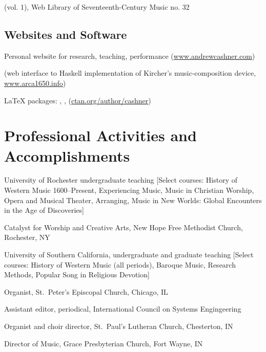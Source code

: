 \documentclass[11pt]{article}
\begin{document}
{
(vol. 1), Web Library of Seventeenth-Century Music no. 32}

\subsection{Websites and Software}

{Personal website for research, teaching, performance (\url{www.andrewcashner.com})}

{ (web interface to Haskell implementation of Kircher's
music-composition device, \url{www.arca1650.info})}

{\LaTeX{} packages: , ,
 (\url{ctan.org/author/cashner})}

\section{Professional Activities and Accomplishments}
{University of Rochester undergraduate teaching}
[Select courses: 
History of Western Music 1600--Present, 
Experiencing Music, 
Music in Christian Worship, 
Opera and Musical Theater, 
Arranging, 
Music in New Worlds: Global Encounters in the Age of Discoveries]

{Catalyst for Worship and Creative Arts,
New Hope Free Methodist Church, Rochester, NY}

{University of Southern California, undergraduate and graduate teaching}
[Select courses:
History of Western  Music (all periods), Baroque Music, Research Methods,
Popular Song in Religious Devotion]

{Organist, St.\ Peter's Episcopal Church, Chicago, IL}

{Assistant editor,  periodical, International Council on
Systems Engingeering}
    
{Organist and choir director, St.\ Paul's Lutheran Church, Chesterton, IN}
    
{Director of Music, Grace Presbyterian Church, Fort Wayne, IN}
\end{document}
